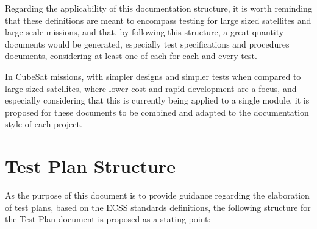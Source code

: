 Regarding the applicability of this documentation structure, it is worth reminding that these definitions are meant to encompass testing for large sized satellites and large scale missions, and that, by following this structure, a great quantity documents would be generated, especially test specifications and procedures documents, considering at least one of each for each and every test.

In CubeSat missions, with simpler designs and simpler tests when compared to large sized satellites, where lower cost and rapid development are a focus, and especially considering that this is currently being applied to a single module, it is proposed for these documents to be combined and adapted to the documentation style of each project.



\section{Test Plan Structure} \label{sec:test-plan-structure}


As the purpose of this document is to provide guidance regarding the elaboration of test plans, based on the ECSS standards definitions, the following structure for the Test Plan document is proposed as a stating point:


